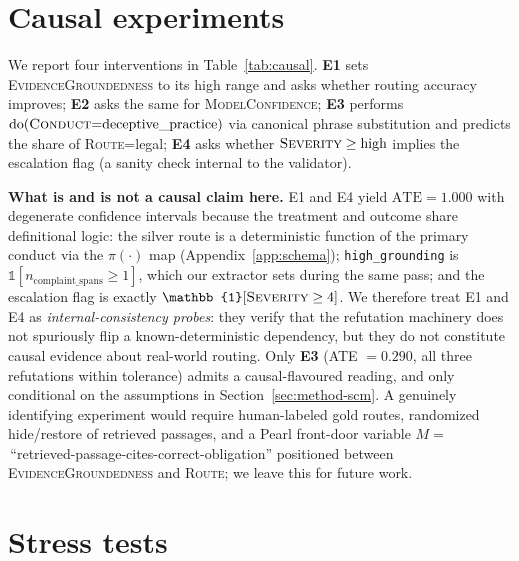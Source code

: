 \documentclass[11pt]{article}
\begin{document}
\section{Causal experiments}\label{sec:causal}

We report four interventions in Table~\ref{tab:causal}.
\textbf{E1} sets \textsc{EvidenceGroundedness} to its high range and asks
whether routing accuracy improves; \textbf{E2} asks the same for
\textsc{ModelConfidence}; \textbf{E3} performs
$\mathrm{do}(\textsc{Conduct}{=}\text{deceptive\_practice})$ via canonical
phrase substitution and predicts the share of \textsc{Route}={legal};
\textbf{E4} asks whether $\textsc{Severity}\geq\text{high}$ implies the
escalation flag (a sanity check internal to the validator).



\textbf{What is and is not a causal claim here.} E1 and E4 yield
$\mathrm{ATE}=1.000$ with degenerate confidence intervals because the
treatment and outcome share definitional logic: the silver route is a
deterministic function of the primary conduct via the
$\pi(\cdot)$ map (Appendix~\ref{app:schema}); \texttt{high\_grounding} is
$\mathbb{1}[n_{\text{complaint\_spans}}\geq 1]$, which our extractor sets
during the same pass; and the escalation flag is exactly
$\mathbb{1}[\textsc{Severity}\geq 4]$. We therefore treat E1 and E4 as
\emph{internal-consistency probes}: they verify that the refutation
machinery does not spuriously flip a known-deterministic dependency, but
they do not constitute causal evidence about real-world routing. Only
\textbf{E3} (ATE $=0.290$, all three refutations within tolerance) admits a
causal-flavoured reading, and only conditional on the assumptions in
Section~\ref{sec:method-scm}. A genuinely identifying experiment would
require human-labeled gold routes, randomized
hide/restore of retrieved passages, and a Pearl front-door variable
$M=$\,``retrieved-passage-cites-correct-obligation'' positioned between
\textsc{EvidenceGroundedness} and \textsc{Route}; we leave this for future
work.

\section{Stress tests}\label{sec:stress}
\end{document}
